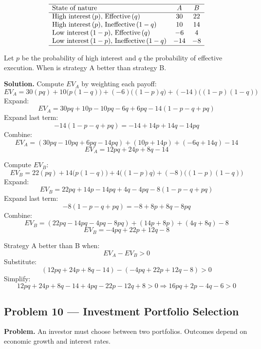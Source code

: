 \begin{ExamProblems}
		\[
		\begin{array}{lcc}
			\hline
			\text{State of nature} & A & B \\
			\hline
			\text{High interest}\,(p),\,\text{Effective}\,(q) & 30 & 22 \\
			\text{High interest}\,(p),\,\text{Ineffective}\,(1-q) & 10 & 14 \\
			\text{Low interest}\,(1-p),\,\text{Effective}\,(q) & -6 & 4 \\
			\text{Low interest}\,(1-p),\,\text{Ineffective}\,(1-q) & -14 & -8 \\
			\hline
		\end{array}
		\]
		
		Let \(p\) be the probability of high interest and \(q\) the probability of effective execution.  
		When is strategy A better than strategy B.
		
		\textbf{Solution.}
		Compute \(EV_A\) by weighting each payoff:
		\[
		EV_A=30(pq)+10\bigl(p(1-q)\bigr)+(-6)\bigl((1-p)q\bigr)+(-14)\bigl((1-p)(1-q)\bigr)
		\]
		Expand:
		\[
		EV_A=30pq + 10p - 10pq - 6q + 6pq - 14(1-p-q+pq)
		\]
		Expand last term:
		\[
		-14(1-p-q+pq)=-14 + 14p + 14q - 14pq
		\]
		Combine:
		\[
		EV_A=(30pq-10pq+6pq-14pq) + (10p+14p) + (-6q+14q) - 14
		\]
		\[
		EV_A=12pq + 24p + 8q - 14
		\]
		
		Compute \(EV_B\):
		\[
		EV_B=22(pq)+14\bigl(p(1-q)\bigr)+4\bigl((1-p)q\bigr)+(-8)\bigl((1-p)(1-q)\bigr)
		\]
		Expand:
		\[
		EV_B=22pq + 14p - 14pq + 4q - 4pq - 8(1-p-q+pq)
		\]
		Expand last term:
		\[
		-8(1-p-q+pq)=-8 + 8p + 8q - 8pq
		\]
		Combine:
		\[
		EV_B=(22pq-14pq-4pq-8pq) + (14p+8p) + (4q+8q) - 8
		\]
		\[
		EV_B=-4pq + 22p + 12q - 8
		\]
		
		Strategy A better than B when:
		\[
		EV_A-EV_B>0
		\]
		Substitute:
		\[
		(12pq+24p+8q-14)-(-4pq+22p+12q-8)>0
		\]
		Simplify:
		\[
		12pq+24p+8q-14+4pq-22p-12q+8>0
		\Rightarrow 16pq+2p-4q-6>0
		\]
		
		
		\hypertarget{c7-ex10}{}
		\item\leavevmode\par
		\subsection*{Problem 10 — Investment Portfolio Selection}
		
		\textbf{Problem.}
		An investor must choose between two portfolios. Outcomes depend on economic growth
		and interest rates.
		

\end{ExamProblems}
